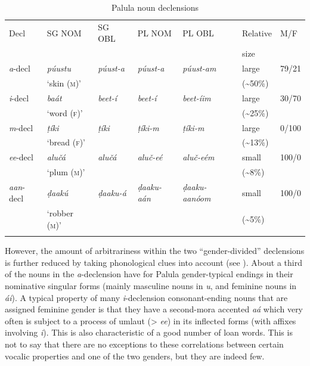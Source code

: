 \documentclass[output=collectionpaper]{langsci/langscibook}
\begin{document}
\begin{table}[htb]
\small
\begin{tabularx}{\textwidth}{lXlllll}
\lsptoprule
Decl & SG NOM & SG OBL & PL NOM & PL OBL & Relative & \textsc{M/}\textsc{F} \\
&&&&& size & \\
\midrule
\textit{a}{}-decl & \textit{púustu}  & \itshape púust{}-a & \itshape púust{}-a & \itshape púust{}-am & large  & 79/21\\
& `skin (\textsc{m})' &&&& ({\textasciitilde}50\%) &\\
\textit{i}{}-decl & \textit{baát}  & \itshape beet{}-í & \itshape beet-í & \itshape beet-íim & large  & 30/70\\
& `word (\textsc{f})' &&&& ({\textasciitilde}25\%) \\
\textit{m}{}-decl & \textit{ṭíki}  & \itshape ṭíki & \itshape ṭíki-m & \itshape ṭíki-m & large  & 0/100\\
& `bread (\textsc{f})' &&&& ({\textasciitilde}13\%) \\
\textit{ee}{}-decl & \textit{alučá}  & \itshape alučá & \itshape aluč-eé & \itshape aluč-eém & small  & 100/0\\
& `plum (\textsc{m})' &&&& ({\textasciitilde}8\%) \\
\textit{aan}{}-decl & \textit{ḍaakú}  & \itshape ḍaaku-á & \itshape ḍaaku-aán & \itshape ḍaaku-aanóom & small  & 100/0\\
& `robber (\textsc{m})' &&&& ({\textasciitilde}5\%) \\
\lspbottomrule
\end{tabularx}
\caption{Palula noun declensions}
\label{tab:Lilje:7}
\end{table}


However, the amount of arbitrariness within the two ``gender-divided'' declensions is further reduced by taking phonological clues into account (see ). About a third of the nouns in the \textit{a}{}-declension have for Palula gender-typical endings in their nominative singular forms (mainly masculine nouns in \textit{u}, and feminine nouns in \textit{\'ai}). A typical property of many \textit{i}{}-declension consonant-ending nouns that are assigned feminine gender is that they have a second-mora accented \textit{aá} which very often is subject to a process of umlaut (> \textit{ee}) in its inflected forms (with affixes involving \textit{i}). This is also characteristic of a good number of loan words. This is not to say that there are no exceptions to these correlations between certain vocalic properties and one of the two genders, but they are indeed few.
\end{document}
